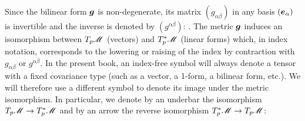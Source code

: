 Since the bilinear form $\bm{g}$ is non-degenerate, its matrix $(g_{\alpha\beta})$ in
any basis $(\bm{e}_\alpha)$ is invertible and the inverse is denoted by $(g^{\alpha\beta})$:
\be
  .
\ee
The metric $\bm{g}$ induces an isomorphism between
$T_p\mathscr{M}$ (vectors) and ${T_p^*\mathscr{M}}$ (linear forms) which, in  index notation,
corresponds to the lowering or
raising of the index by contraction
with $g_{\alpha\beta}$ or $g^{\alpha\beta}$.
In the present book, an index-free symbol will always denote
a tensor with a fixed covariance type (such as a vector, a 1-form,
a bilinear form, etc.). We will therefore use a different symbol
to denote its image under the metric isomorphism.
In particular, we denote by an underbar the
isomorphism $T_p\mathscr{M} \rightarrow {T_p^*\mathscr{M}}$
and by an arrow the reverse isomorphism ${T_p^*\mathscr{M}} \rightarrow T_p\mathscr{M}$:
